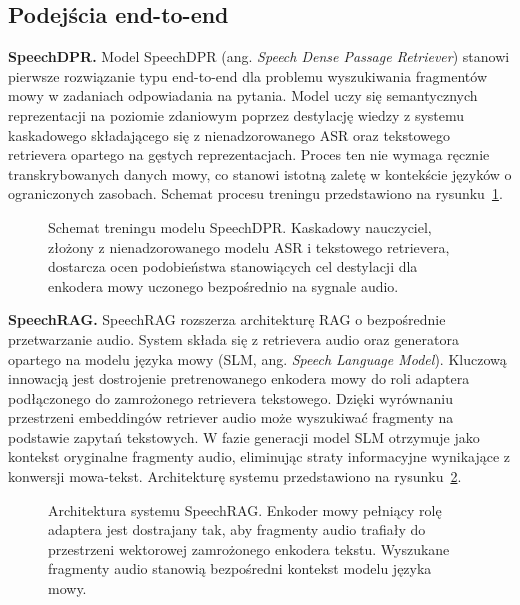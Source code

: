 \subsection{Podejścia end-to-end}

\textbf{SpeechDPR.} Model SpeechDPR (ang. \textit{Speech Dense Passage Retriever}) \cite{lin2024speechdprendtoendspokenpassage} stanowi pierwsze rozwiązanie typu end-to-end dla problemu wyszukiwania fragmentów mowy w zadaniach odpowiadania na pytania. Model uczy się semantycznych reprezentacji na poziomie zdaniowym poprzez destylację wiedzy z systemu kaskadowego składającego się z nienadzorowanego ASR oraz tekstowego retrievera opartego na gęstych reprezentacjach. Proces ten nie wymaga ręcznie transkrybowanych danych mowy, co stanowi istotną zaletę w kontekście języków o ograniczonych zasobach. Schemat procesu treningu przedstawiono na rysunku~\ref{fig:speechdprArchitecture}.

\begin{figure}[htbp]
    \centering
    \caption{Schemat treningu modelu SpeechDPR. Kaskadowy nauczyciel, złożony z nienadzorowanego modelu ASR i tekstowego retrievera, dostarcza ocen podobieństwa stanowiących cel destylacji dla enkodera mowy uczonego bezpośrednio na sygnale audio.}
    \label{fig:speechdprArchitecture}
\end{figure}

\textbf{SpeechRAG.} SpeechRAG \cite{min2025speechretrievalaugmentedgenerationautomatic} rozszerza architekturę RAG o bezpośrednie przetwarzanie audio. System składa się z retrievera audio oraz generatora opartego na modelu języka mowy (SLM, ang. \textit{Speech Language Model}). Kluczową innowacją jest dostrojenie pretrenowanego enkodera mowy do roli adaptera podłączonego do zamrożonego retrievera tekstowego. Dzięki wyrównaniu przestrzeni embeddingów retriever audio może wyszukiwać fragmenty na podstawie zapytań tekstowych. W fazie generacji model SLM otrzymuje jako kontekst oryginalne fragmenty audio, eliminując straty informacyjne wynikające z konwersji mowa-tekst. Architekturę systemu przedstawiono na rysunku~\ref{fig:speechragArchitecture}.

\begin{figure}[htbp]
    \centering
    \caption{Architektura systemu SpeechRAG. Enkoder mowy pełniący rolę adaptera jest dostrajany tak, aby fragmenty audio trafiały do przestrzeni wektorowej zamrożonego enkodera tekstu. Wyszukane fragmenty audio stanowią bezpośredni kontekst modelu języka mowy.}
    \label{fig:speechragArchitecture}
\end{figure}

